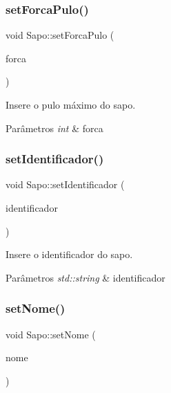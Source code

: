 \subsubsection{\texorpdfstring{set\+Forca\+Pulo()}{setForcaPulo()}}
{\footnotesize\ttfamily void Sapo\+::set\+Forca\+Pulo (\begin{DoxyParamCaption}\item[{int}]{forca }\end{DoxyParamCaption})}



Insere o pulo máximo do sapo. 


\begin{DoxyParams}{Parâmetros}
{\em int} & forca \\
\hline
\end{DoxyParams}
\mbox{\label{classSapo_a617cde091fd409e66caacee5bf079e05}} 
\subsubsection{\texorpdfstring{set\+Identificador()}{setIdentificador()}}
{\footnotesize\ttfamily void Sapo\+::set\+Identificador (\begin{DoxyParamCaption}\item[{std\+::string}]{identificador }\end{DoxyParamCaption})}



Insere o identificador do sapo. 


\begin{DoxyParams}{Parâmetros}
{\em std\+::string} & identificador \\
\hline
\end{DoxyParams}
\mbox{\label{classSapo_aacafe6399f877e9bda12c146531fe31f}} 
\subsubsection{\texorpdfstring{set\+Nome()}{setNome()}}
{\footnotesize\ttfamily void Sapo\+::set\+Nome (\begin{DoxyParamCaption}\item[{std\+::string}]{nome }\end{DoxyParamCaption})}



